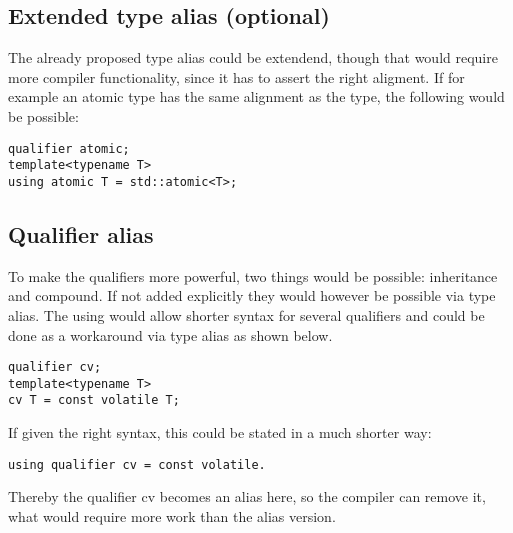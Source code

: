\subsection{Extended type alias (optional)}
The already proposed type alias could be extendend, though that would require more compiler functionality, since it has to assert the right aligment. If for example an atomic type has the same alignment as the type, the following would be possible:
\begin{lstlisting}
qualifier atomic;
template<typename T>
using atomic T = std::atomic<T>;
\end{lstlisting}
\subsection{Qualifier alias}
To make the qualifiers more powerful, two things would be possible: inheritance and compound. If not added explicitly they would however be possible via type alias. The using would allow shorter syntax for several qualifiers and could be done as a workaround via type alias as shown below.  
\begin{lstlisting}
qualifier cv;
template<typename T>
cv T = const volatile T;
\end{lstlisting}
If given the right syntax, this could be stated in a much shorter way:
\begin{lstlisting}
using qualifier cv = const volatile.
\end{lstlisting}
Thereby the qualifier cv becomes an alias here, so the compiler can remove it, what would require more work than the alias version.
